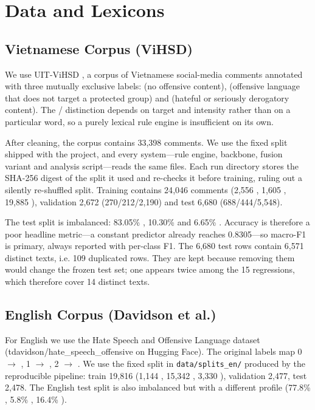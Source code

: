 \section{Data and Lexicons}
\label{sec:data}

\subsection{Vietnamese Corpus (ViHSD)}
\label{sec:vihsd}

We use UIT-ViHSD \cite{luu2021vihsd}, a corpus of Vietnamese social-media
comments annotated with three mutually exclusive labels: \clean{} (no offensive
content), \off{} (offensive language that does not target a protected group)
and \hate{} (hateful or seriously derogatory content).  The \off{}/\hate{}
distinction depends on target and intensity rather than on a particular word,
so a purely lexical rule engine is insufficient on its own.

After cleaning, the corpus contains 33{,}398 comments.  We use the fixed split
shipped with the project, and every system---rule engine, backbone, fusion
variant and analysis script---reads the same files.  Each run directory stores
the SHA-256 digest of the split it used and re-checks it before training,
ruling out a silently re-shuffled split.  Training contains 24{,}046 comments
(2{,}556 \hate{}, 1{,}605 \off{}, 19{,}885 \clean{}), validation 2{,}672
(270/212/2{,}190) and test 6{,}680 (688/444/5{,}548).

The test split is imbalanced: 83.05\% \clean{}, 10.30\% \hate{} and 6.65\%
\off{}.  Accuracy is therefore a poor headline metric---a constant \clean{}
predictor already reaches 0.8305---so macro-F1 is primary, always reported
with per-class F1.  The 6{,}680 test rows contain 6{,}571 distinct texts,
i.e. 109 duplicated rows.  They are kept because removing them would change
the frozen test set; one appears twice among the 15 regressions, which
therefore cover 14 distinct texts.

\subsection{English Corpus (Davidson et al.)}
\label{sec:davidson}

For English we use the Hate Speech and Offensive Language dataset
\cite{davidson2017automated} (tdavidson/hate\_speech\_offensive on Hugging Face).
The original labels map 0 $\to$ \hate{}, 1 $\to$ \off{}, 2 $\to$ \clean{}.
We use the fixed split in \texttt{data/splits\_en/} produced by the
reproducible pipeline: train 19{,}816 (1{,}144 \hate{}, 15{,}342 \off{},
3{,}330 \clean{}), validation 2{,}477, test 2{,}478.  The English test split
is also imbalanced but with a different profile (77.8\% \off{}, 5.8\% \hate{},
16.4\% \clean{}).

